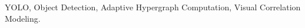 \begin{abstract}

\end{abstract}

\begin{IEEEkeywords}
YOLO, Object Detection, Adaptive Hypergraph Computation, Visual Correlation Modeling.
\end{IEEEkeywords}